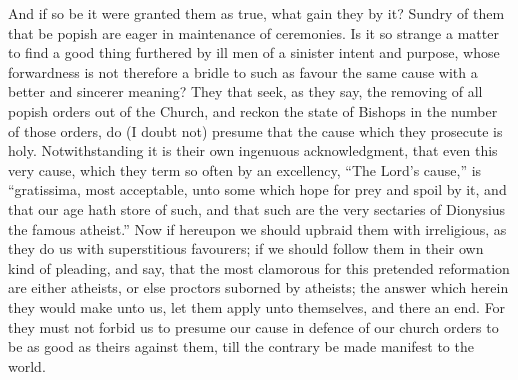 And if so be it were granted them as true, what gain they by it? Sundry of them that be popish are eager in maintenance of ceremonies. Is it so strange a matter to find a good thing furthered by ill men of a sinister intent and purpose, whose forwardness is not therefore a bridle to such as favour the same cause with a better and sincerer meaning? They that seek, as they say, the removing of all popish orders out of the Church, and reckon the state of Bishops in the number of those orders, do (I doubt not) presume that the cause which they prosecute is holy. Notwithstanding it is their own ingenuous acknowledgment, that even this very cause, which they term so often by an excellency, “The Lord’s cause,” is “gratissima, most acceptable, unto some which hope for prey and spoil by it, and that our age hath store of such, and that such are the very sectaries of Dionysius the famous atheist.” Now if hereupon we should upbraid them with irreligious, as they do us with superstitious favourers; if we should follow them in their own kind of pleading, and say, that the most clamorous for this pretended reformation are either atheists, or else proctors suborned by atheists; the answer which herein they  would make unto us, let them apply unto themselves, and there an end. For they must not forbid us to presume our cause in defence of our church orders to be as good as theirs against them, till the contrary be made manifest to the world.

